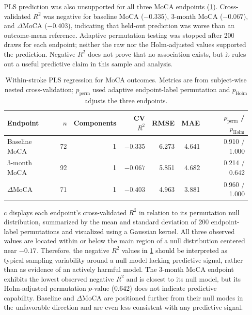 \documentclass[preprint,12pt]{elsarticle}
\begin{document}
PLS prediction was also unsupported for all three MoCA endpoints (\cref{tab:clinical_pls}). Cross-validated $R^2$ was negative for baseline MoCA ($-0.335$), 3-month MoCA ($-0.067$), and $\Delta$MoCA ($-0.403$), indicating that held-out prediction was worse than an outcome-mean reference. Adaptive permutation testing was stopped after 200 draws for each endpoint; neither the raw nor the Holm-adjusted values supported the prediction. Negative $R^2$ does not prove that no association exists, but it rules out a useful predictive claim in this sample and analysis.

\begin{table}[hbp]
\centering
\caption{Within-stroke PLS regression for MoCA outcomes. Metrics are from subject-wise nested cross-validation; $p_{\mathrm{perm}}$ used adaptive endpoint-label permutation and $p_{\mathrm{Holm}}$ adjusts the three endpoints.}
\label{tab:clinical_pls}
\small
\renewcommand{\arraystretch}{1.2}
\begin{tabular}{@{}lrrrrrr@{}}
\toprule
Endpoint & $n$ & Components & CV $R^2$ & RMSE & MAE & $p_{\mathrm{perm}}$ / $p_{\mathrm{Holm}}$ \\
\midrule
Baseline MoCA & 72 & 1 & $-0.335$ & 6.273 & 4.641 & 0.910 / 1.000 \\
3-month MoCA & 92 & 1 & $-0.067$ & 5.851 & 4.682 & 0.214 / 0.642 \\
$\Delta$MoCA & 71 & 1 & $-0.403$ & 4.963 & 3.881 & 0.960 / 1.000 \\
\bottomrule
\end{tabular}
\end{table}

c displays each endpoint's cross-validated $R^2$ in relation to its permutation null distribution, summarized by the mean and standard deviation of 200 endpoint-label permutations and visualized using a Gaussian kernel. All three observed values are located within or below the main region of a null distribution centered near $-0.17$. Therefore, the negative $R^2$ values in \cref{tab:clinical_pls} should be interpreted as typical sampling variability around a null model lacking predictive signal, rather than as evidence of an actively harmful model. The 3-month MoCA endpoint exhibits the lowest observed negative $R^2$ and is closest to its null model, but its Holm-adjusted permutation $p$-value (0.642) does not indicate predictive capability. Baseline and $\Delta$MoCA are positioned further from their null modes in the unfavorable direction and are even less consistent with any predictive signal.
\end{document}
